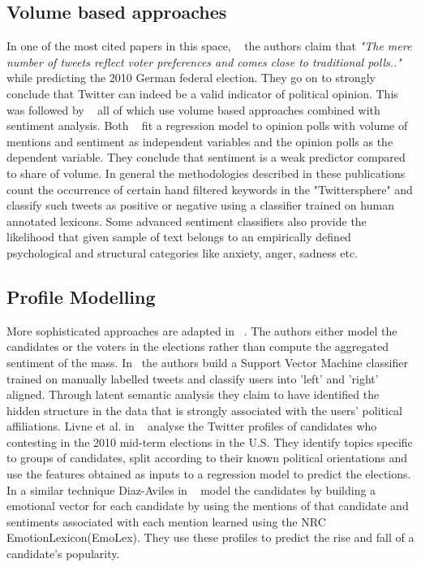 \subsection{Volume based approaches}
In one of the most cited papers in this space, ~\cite{tumasjan2010predicting} the authors claim that 
\emph{ "The mere number of tweets reflect voter preferences and comes close to  traditional polls.."}
while predicting  the 2010 German federal election. %
They go on to strongly conclude that Twitter can indeed be a valid indicator of political opinion.
This was followed by ~\cite{o2010tweets,saez2011total,bermingham2011using,demartini2011analyzing} all of which use volume based approaches combined with sentiment analysis.
Both ~\cite{o2010tweets,bermingham2011using} fit a regression model to opinion polls with volume of mentions and sentiment as independent variables and the opinion polls as the dependent variable. 
They conclude that sentiment is a weak predictor compared to share of volume.
\newline In general the methodologies described in these publications count the occurrence of certain hand filtered keywords in the "Twittersphere" and classify such tweets as positive or negative using a classifier trained on human annotated lexicons.
Some advanced sentiment classifiers also provide the likelihood that given sample of text belongs to an empirically defined psychological and structural categories like anxiety, anger, sadness etc.
\subsection{Profile Modelling}
More sophisticated approaches are adapted in ~\cite{livne2011party,conover2011predicting,diaz2012taking}. 
The authors either model the candidates or the voters in the elections rather than compute the aggregated sentiment of the mass.  
In~\cite{conover2011predicting} the authors build a Support Vector Machine classifier trained on manually labelled tweets and classify users into 'left' and 'right' aligned.
Through latent semantic analysis they claim to have identified the hidden structure in the data that is strongly associated with the users' political affiliations.
Livne et al. in ~\cite{livne2011party} analyse the Twitter profiles of candidates who contesting in the 2010 mid-term elections in the U.S. 
They identify topics specific to groups of candidates, split according to their known political orientations and use the features obtained as inputs to a regression model to predict the elections. 
In a similar technique Diaz-Aviles in ~\cite{diaz2012taking} model the candidates by building a emotional vector for each candidate by using the mentions of that candidate and sentiments associated with each mention learned using the NRC EmotionLexicon(EmoLex). 
They use these profiles to predict the rise and fall of a candidate's popularity. 

